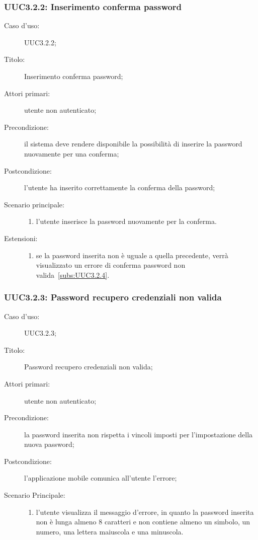 \documentclass[../../../analisi-dei-requisiti.tex]{subfiles}
\begin{document}
\subsubsection{UUC3.2.2: Inserimento conferma password}%
\label{subs:UUC3.2.2}
\begin{description}
  \item[Caso d'uso:] UUC3.2.2;
  \item[Titolo:] Inserimento conferma password;
  \item[Attori primari:] utente non autenticato;
  \item[Precondizione:] il sistema deve rendere disponibile la possibilità di inserire la password nuovamente per una conferma;
  \item[Postcondizione:] l'utente ha inserito correttamente la conferma della password;
  \item[Scenario principale:]
        \begin{enumerate}
          \item l'utente inserisce la password nuovamente per la conferma.
        \end{enumerate}
  \item[Estensioni:]
        \begin{enumerate}
          \item se la password inserita non è uguale a quella precedente, verrà visualizzato un errore di conferma password non valida~\ref{subs:UUC3.2.4}.
        \end{enumerate}
\end{description}

\subsubsection{UUC3.2.3: Password recupero credenziali non valida}%
\label{subs:UUC3.2.3}
\begin{description}
  \item[Caso d'uso:] UUC3.2.3;
  \item[Titolo:] Password recupero credenziali non valida;
  \item[Attori primari:] utente non autenticato;
  \item[Precondizione:] la password inserita non rispetta i vincoli imposti per l'impostazione della nuova password;
  \item[Postcondizione:] l'applicazione mobile comunica all'utente l'errore;
  \item[Scenario Principale:]
        \begin{enumerate}
          \item l'utente visualizza il messaggio d'errore, in quanto la password inserita non è lunga almeno 8 caratteri e non contiene almeno un simbolo, un numero, una lettera maiuscola e una minuscola.
        \end{enumerate}
\end{description}
\end{document}
